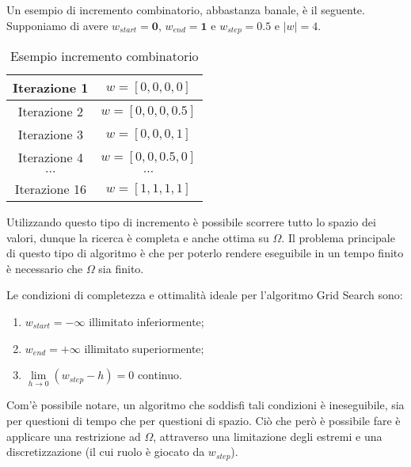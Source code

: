 \begin{esempio}
Un esempio di incremento combinatorio, abbastanza banale, è il seguente.
Supponiamo di avere $w_{start} = \boldsymbol{0}$, $w_{end} = \boldsymbol{1}$
e $w_{step} = 0.5$ e $\left|w\right| = 4$.


\begin{table}[h]
	\centering
	\begin{tabular}{|c|c|}
		\hline
		Iterazione 1 & $w = \left[0, 0, 0, 0\right]$ \\
		\hline
		Iterazione 2 & $w = \left[0, 0, 0, 0.5\right]$ \\
		\hline
		Iterazione 3 & $w = \left[0, 0, 0, 1\right]$ \\
		\hline
		Iterazione 4 & $w = \left[0, 0, 0.5, 0\right]$ \\
		\hline
		$\cdots$ & $\cdots$ \\
		\hline
		Iterazione 16 & $w = \left[1,1,1,1\right]$ \\
		\hline
	\end{tabular}
	\caption{Esempio incremento combinatorio}
\end{table}
\end{esempio}

Utilizzando questo tipo di incremento è possibile scorrere
tutto lo spazio dei valori, dunque la ricerca è completa e anche ottima
su $\Omega$.
Il problema principale di questo tipo di algoritmo è che
per poterlo rendere eseguibile in un tempo finito
è necessario che $\Omega$ sia finito.

\begin{definizione}
	Le condizioni di completezza e ottimalità ideale per l'algoritmo Grid Search sono:
	\begin{enumerate}
		\item $w_{start} = \boldsymbol{-\infty}$ illimitato inferiormente;
		\item $w_{end} = \boldsymbol{+\infty}$ illimitato superiormente;
		\item $\lim\limits_{h \to 0} \left(w_{step} - h\right) = 0$ continuo.
	\end{enumerate}
\end{definizione}

Com'è possibile notare, un algoritmo che soddisfi tali condizioni è
ineseguibile, sia per questioni di tempo che per questioni di spazio.
Ciò che però è possibile fare è applicare una restrizione ad $\Omega$, attraverso
una limitazione degli estremi e una discretizzazione (il cui ruolo è giocato da $w_{step}$).

